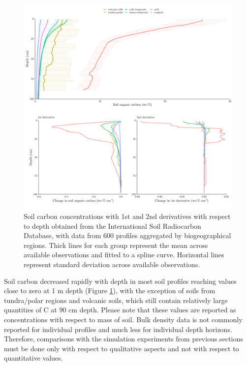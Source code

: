 \documentclass[11pt, oneside, a4paper]{article}   	%
\begin{document}
\begin{figure}[htbp]
   \centering
   \includegraphics[width=\textwidth]{Figures/profiles.pdf} %
   \caption{Soil carbon concentrations with 1st and 2nd derivatives with respect to depth obtained from the International Soil Radiocarbon Database, with data from 600 profiles aggregated by biogeographical regions. Thick lines for each group represent the mean across available observations and fitted to a spline curve. Horizontal lines represent standard deviation across available observations. }
   \label{fig:Cprofiles}
\end{figure}

Soil carbon decreased rapidly with depth in most soil profiles reaching values close to zero at 1 m depth (Figure \ref{fig:Cprofiles}), with the exception of soils from tundra/polar regions and volcanic soils, which still contain relatively large quantities of C at 90 cm depth. Please note that these values are reported as concentrations with respect to mass of soil. Bulk density data is not commonly reported for individual profiles and much less for individual depth horizons. Therefore, comparisons with the simulation experiments from previous sections must be done only with respect to qualitative aspects and not with respect to quantitative values. 

\end{document}
